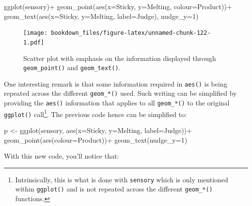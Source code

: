 \documentclass[
]{krantz}
\makeatletter
\newenvironment{Shaded}{\begin{snugshade}}{\end{snugshade}}
\newcommand{\AttributeTok}[1]{\textcolor[rgb]{0.61,0.61,0.61}{#1}}
\newcommand{\DecValTok}[1]{\textcolor[rgb]{0.06,0.06,0.06}{#1}}
\newcommand{\FunctionTok}[1]{\textcolor[rgb]{0,0,0}{#1}}
\newcommand{\NormalTok}[1]{#1}
\newcommand{\OtherTok}[1]{\textcolor[rgb]{0.37,0.37,0.37}{#1}}
\newcommand{\SpecialCharTok}[1]{\textcolor[rgb]{0,0,0}{#1}}
\newenvironment{kframe}{%
\medskip{}
\setlength{\fboxsep}{.8em}
 \def\at@end@of@kframe{}%
 \ifinner\ifhmode%
  \def\at@end@of@kframe{\end{minipage}}%
  \begin{minipage}{\columnwidth}%
 \fi\fi%
 \def\FrameCommand##1{\hskip\@totalleftmargin \hskip-\fboxsep
 \colorbox{shadecolor}{##1}\hskip-\fboxsep
     \hskip-\linewidth \hskip-\@totalleftmargin \hskip\columnwidth}%
 \MakeFramed {\advance\hsize-\width
   \@totalleftmargin\z@ \linewidth\hsize
   \@setminipage}}%
 {\par\unskip\endMakeFramed%
 \at@end@of@kframe}
\renewenvironment{Shaded}{\begin{kframe}}{\end{kframe}}
\makeatother
\begin{document}
\begin{Shaded}
\begin{Highlighting}[]
\FunctionTok{ggplot}\NormalTok{(sensory)}\SpecialCharTok{+}
  \FunctionTok{geom\_point}\NormalTok{(}\FunctionTok{aes}\NormalTok{(}\AttributeTok{x=}\NormalTok{Sticky, }\AttributeTok{y=}\NormalTok{Melting, }\AttributeTok{colour=}\NormalTok{Product))}\SpecialCharTok{+}
  \FunctionTok{geom\_text}\NormalTok{(}\FunctionTok{aes}\NormalTok{(}\AttributeTok{x=}\NormalTok{Sticky, }\AttributeTok{y=}\NormalTok{Melting, }\AttributeTok{label=}\NormalTok{Judge), }\AttributeTok{nudge\_y=}\DecValTok{1}\NormalTok{)}
\end{Highlighting}
\end{Shaded}

\begin{figure}
\centering
\texttt{[image: bookdown\_files/figure-latex/unnamed-chunk-122-1.pdf]}
\caption{\label{fig:unnamed-chunk-122}Scatter plot with emphasis on the information displayed through \texttt{geom\_point()} and \texttt{geom\_text()}.}
\end{figure}

One interesting remark is that some information required in \texttt{aes()} is being repeated across the different \texttt{geom\_*()} used. Such writing can be simplified by providing the \texttt{aes()} information that applies to all \texttt{geom\_*()} to the original \texttt{ggplot()} call\footnote{Intrinsically, this is what is done with \texttt{sensory} which is only mentioned within \texttt{ggplot()} and is not repeated across the different \texttt{geom\_*()} functions.}. The previous code hence can be simplified to:

\begin{Shaded}
\begin{Highlighting}[]
\NormalTok{p }\OtherTok{\textless{}{-}} \FunctionTok{ggplot}\NormalTok{(sensory, }\FunctionTok{aes}\NormalTok{(}\AttributeTok{x=}\NormalTok{Sticky, }\AttributeTok{y=}\NormalTok{Melting, }\AttributeTok{label=}\NormalTok{Judge))}\SpecialCharTok{+}
  \FunctionTok{geom\_point}\NormalTok{(}\FunctionTok{aes}\NormalTok{(}\AttributeTok{colour=}\NormalTok{Product))}\SpecialCharTok{+}
  \FunctionTok{geom\_text}\NormalTok{(}\AttributeTok{nudge\_y=}\DecValTok{1}\NormalTok{)}
\end{Highlighting}
\end{Shaded}

With this new code, you'll notice that:
\end{document}
